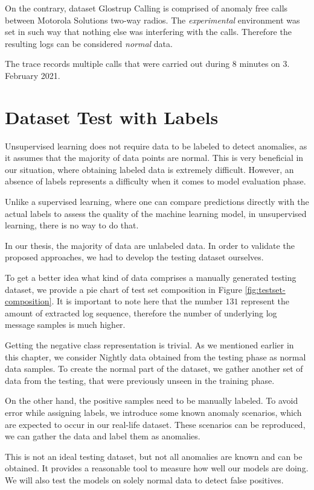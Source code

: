 On the contrary, dataset Glostrup Calling is comprised of anomaly free calls between Motorola Solutions two-way radios. 
The \textit{experimental} environment was set in such way that nothing else was interfering with the calls. Therefore the resulting logs can be considered \textit{normal} data.

The trace records multiple calls that were carried out during 8 minutes on 3. February 2021.

\section{Dataset Test with Labels} 
\label{section:testset}
Unsupervised learning does not require data to be labeled to detect anomalies, as it assumes that the majority of data points are normal. This is very beneficial in our situation, where obtaining labeled data is extremely difficult. However, an absence of labels represents a difficulty when it comes to model evaluation phase.

Unlike a supervised learning, where one can compare predictions directly with the actual labels to assess the quality of the machine learning model, in unsupervised learning, there is no way to do that.

In our thesis, the majority of data are unlabeled data. In order to validate the proposed approaches, we had to develop the testing dataset ourselves.

To get a better idea what kind of data comprises a manually generated testing dataset, we provide a pie chart of test set composition in Figure \ref{fig:testset-composition}. It is important to note here that the number $131$ represent the amount of extracted log sequence, therefore the number of underlying log message samples is much higher.

Getting the negative class representation is trivial. As we mentioned earlier in this chapter, we consider Nightly data obtained from the testing phase as normal data samples. To create the normal part of the dataset, we gather another set of data from the testing, that were previously unseen in the training phase. 

On the other hand, the positive samples need to be manually labeled. To avoid error while assigning labels, we introduce some known anomaly scenarios, which are expected to occur in our real-life dataset. These scenarios can be reproduced, we can gather the data and label them as anomalies. 

This is not an ideal testing dataset, but not all anomalies are known and can be obtained. It provides a reasonable tool to measure how well our models are doing. We will also test the models on solely normal data to detect false positives. 

